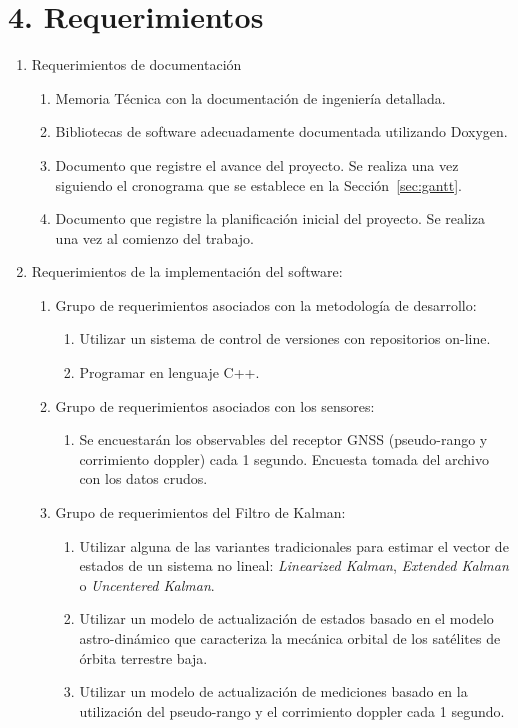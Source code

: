 \documentclass[11pt]{charter}
\begin{document}
\section{4. Requerimientos}
\label{sec:requerimientos}

\begin{enumerate}
\item Requerimientos de documentación
	\begin{enumerate}
	\item Memoria Técnica con la documentación de ingeniería detallada.
	\item Bibliotecas de software adecuadamente documentada utilizando Doxygen.
	\item Documento que registre el avance del proyecto. Se realiza una vez siguiendo el cronograma que se establece en la Sección~\ref{sec:gantt}.
	\item Documento que registre la planificación inicial del proyecto. Se realiza una vez al comienzo del trabajo.
	\end{enumerate}
\item Requerimientos de la implementación del software:
	\begin{enumerate}
	\item Grupo de requerimientos asociados con la metodología de desarrollo:
		\begin{enumerate}
		\item Utilizar un sistema de control de versiones con repositorios on-line.
		\item Programar en lenguaje C++.
		\end{enumerate}
	\item Grupo de requerimientos asociados con los sensores:
		\begin{enumerate}
		\item Se encuestarán los observables del receptor GNSS (pseudo-rango y corrimiento doppler) cada 1 segundo. Encuesta tomada del archivo con los datos crudos.
		\end{enumerate}
	\item Grupo de requerimientos del Filtro de Kalman:
		\begin{enumerate}
		\item Utilizar alguna de las variantes tradicionales para estimar el vector de estados de un sistema no lineal: \textit{Linearized Kalman}, \textit{Extended Kalman} o \textit{Uncentered Kalman}.
		\item Utilizar un modelo de actualización de estados basado en el modelo astro-dinámico que caracteriza la mecánica orbital de los satélites de órbita terrestre baja.
		\item Utilizar un modelo de actualización de mediciones basado en la utilización del pseudo-rango y el corrimiento doppler cada 1 segundo.
		\end{enumerate}
	\end{enumerate}
\end{enumerate}
\end{document}
